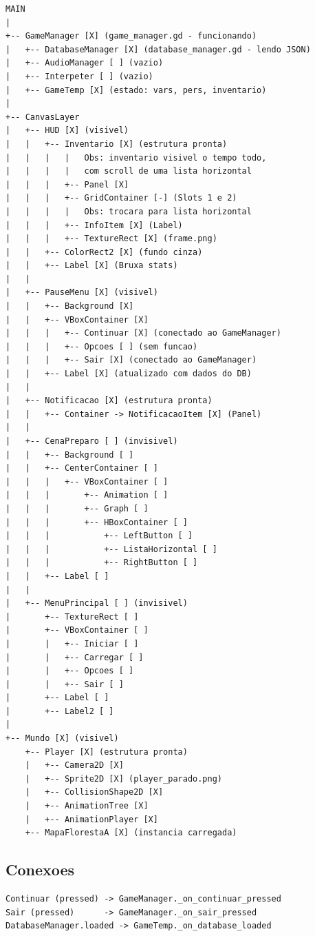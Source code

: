 \documentclass[12pt]{article}
\begin{document}
\begin{verbatim}
MAIN
|
+-- GameManager [X] (game_manager.gd - funcionando)
|   +-- DatabaseManager [X] (database_manager.gd - lendo JSON)
|   +-- AudioManager [ ] (vazio)
|   +-- Interpeter [ ] (vazio)
|   +-- GameTemp [X] (estado: vars, pers, inventario)
|
+-- CanvasLayer
|   +-- HUD [X] (visivel)
|   |   +-- Inventario [X] (estrutura pronta) 
|   |   |   |   Obs: inventario visivel o tempo todo,
|   |   |   |   com scroll de uma lista horizontal
|   |   |   +-- Panel [X]
|   |   |   +-- GridContainer [-] (Slots 1 e 2) 
|   |   |   |   Obs: trocara para lista horizontal
|   |   |   +-- InfoItem [X] (Label)
|   |   |   +-- TextureRect [X] (frame.png)
|   |   +-- ColorRect2 [X] (fundo cinza)
|   |   +-- Label [X] (Bruxa stats)
|   |
|   +-- PauseMenu [X] (visivel)
|   |   +-- Background [X]
|   |   +-- VBoxContainer [X]
|   |   |   +-- Continuar [X] (conectado ao GameManager)
|   |   |   +-- Opcoes [ ] (sem funcao)
|   |   |   +-- Sair [X] (conectado ao GameManager)
|   |   +-- Label [X] (atualizado com dados do DB)
|   |
|   +-- Notificacao [X] (estrutura pronta)
|   |   +-- Container -> NotificacaoItem [X] (Panel)
|   |
|   +-- CenaPreparo [ ] (invisivel)
|   |   +-- Background [ ]
|   |   +-- CenterContainer [ ]
|   |   |   +-- VBoxContainer [ ]
|   |   |       +-- Animation [ ]
|   |   |       +-- Graph [ ]
|   |   |       +-- HBoxContainer [ ]
|   |   |           +-- LeftButton [ ]
|   |   |           +-- ListaHorizontal [ ]
|   |   |           +-- RightButton [ ]
|   |   +-- Label [ ]
|   |
|   +-- MenuPrincipal [ ] (invisivel)
|       +-- TextureRect [ ]
|       +-- VBoxContainer [ ]
|       |   +-- Iniciar [ ]
|       |   +-- Carregar [ ]
|       |   +-- Opcoes [ ]
|       |   +-- Sair [ ]
|       +-- Label [ ]
|       +-- Label2 [ ]
|
+-- Mundo [X] (visivel)
    +-- Player [X] (estrutura pronta)
    |   +-- Camera2D [X]
    |   +-- Sprite2D [X] (player_parado.png)
    |   +-- CollisionShape2D [X]
    |   +-- AnimationTree [X]
    |   +-- AnimationPlayer [X]
    +-- MapaFlorestaA [X] (instancia carregada)
\end{verbatim}


\subsection{Conexoes}

\begin{verbatim}
Continuar (pressed) -> GameManager._on_continuar_pressed
Sair (pressed)      -> GameManager._on_sair_pressed
DatabaseManager.loaded -> GameTemp._on_database_loaded
\end{verbatim}
\end{document}

